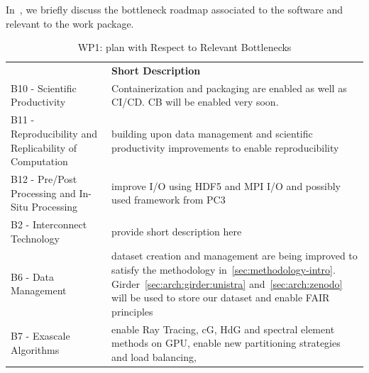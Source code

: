 In~, we briefly discuss the bottleneck roadmap associated to the software and relevant to the work package.

\begin{table}[!ht]
    \centering

    {
        \setlength{\parindent}{0pt}
        \def\arraystretch{1.25}
        {
            \fontsize{9}{11}\selectfont
            \begin{tabular}{!{\color{numpexgray}\vrule}p{.25\linewidth}!{\color{numpexgray}\vrule}p{.6885\linewidth}!{\color{numpexgray}\vrule}}

     &  {\rule{0pt}{2.5ex}\color{white}\bf Short Description }\\

    B10 - Scientific Productivity & Containerization and packaging are enabled as well as \ac{CI}/\ac{CD}. \ac{CB} will be enabled very soon.\\
    B11 - Reproducibility and Replicability of Computation & building upon data management and scientific productivity improvements to enable reproducibility \\
    B12 - Pre/Post Processing and In-Situ Processing & improve I/O using HDF5 and MPI I/O and possibly used framework from \ac{PC3}\\
    B2 - Interconnect Technology & provide short description here \\
    B6 - Data Management & dataset creation and management are being improved to satisfy the methodology in~\cref{sec:methodology-intro}. Girder~\cref{sec:arch:girder:unistra} and~\cref{sec:arch:zenodo}  will be used to store our dataset and enable FAIR principles\\
    B7 - Exascale Algorithms & enable Ray Tracing, cG, HdG and spectral element methods  on GPU, enable new partitioning strategies and load balancing,  \\
\hline
\end{tabular}
        }
    }
    \caption{WP1: \Feelpp plan with Respect to Relevant Bottlenecks}
    \label{tab:WP1:Feelpp:bottlenecks}
\end{table}
